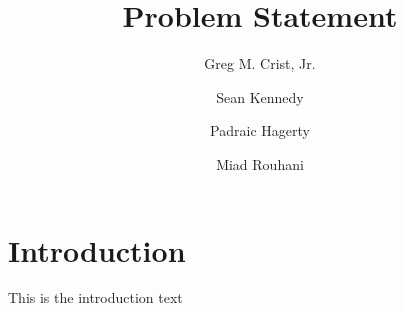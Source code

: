 \documentclass{report}
\title{Problem Statement}
\author{
    Greg M. Crist, Jr.
    \and
    Sean Kennedy
    \and
    Padraic Hagerty
    \and
    Miad Rouhani
}
\begin{document}
\maketitle

\section{Introduction}
This is the introduction text

\section{}
\end{document}
